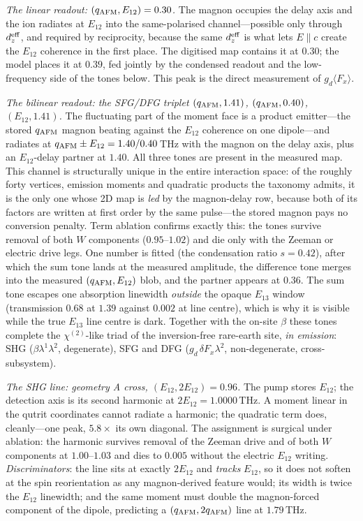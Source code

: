 \documentclass[aps,prb,twocolumn,superscriptaddress,longbibliography]{revtex4-2}
\newcommand{\qafm}{q_{\rm AFM}}
\begin{document}
\emph{The linear readout: $(\qafm,E_{12})=0.30$.}  The magnon
occupies the delay axis and the ion radiates at $E_{12}$ into the
same-polarised channel---possible only through $d_z^{\rm eff}$, and
required by reciprocity, because the same $d_z^{\rm eff}$ is what
lets $E\!\parallel\!c$ create the $E_{12}$ coherence in the first
place.  The digitised map contains it at $0.30$; the model places it
at $0.39$, fed jointly by the condensed readout and the low-frequency
side of the tones below.  This peak is the direct measurement of
$g_d\langle F_x\rangle$.

\emph{The bilinear readout: the SFG/DFG triplet $(\qafm,1.41)$,
$(\qafm,0.40)$, $(E_{12},1.41)$.}  The fluctuating part of the moment
face is a product emitter---the stored $\qafm$ magnon beating against
the $E_{12}$ coherence on one dipole---and radiates at
$\qafm\pm E_{12}=1.40/0.40$\,THz with the magnon on the delay axis,
plus an $E_{12}$-delay partner at $1.40$.  All three tones are
present in the measured map.  This channel is structurally unique in
the entire interaction space: of the roughly forty vertices, emission
moments and quadratic products the taxonomy admits, it is the only
one whose 2D map is \emph{led} by the magnon-delay row, because both
of its factors are written at first order by the same pulse---the
stored magnon pays no conversion penalty.  Term ablation confirms
exactly this: the tones survive removal of both $W$ components
($0.95$--$1.02$) and die only with the Zeeman or electric drive legs.
One number is fitted (the condensation ratio $s=0.42$), after which
the sum tone lands at the measured amplitude, the difference tone
merges into the measured $(\qafm,E_{12})$ blob, and the partner
appears at $0.36$.  The sum tone escapes one absorption linewidth
\emph{outside} the opaque $E_{13}$ window (transmission $0.68$ at
$1.39$ against $0.002$ at line centre), which is why it is visible
while the true $E_{13}$ line centre is dark.  Together with the
on-site $\beta$ these tones complete the $\chi^{(2)}$-like triad of
the inversion-free rare-earth site, \emph{in emission}: SHG
($\beta\lambda^1\lambda^2$, degenerate), SFG and DFG
($g_d\,\delta F_x\lambda^2$, non-degenerate, cross-subsystem).

\emph{The SHG line: geometry A cross, $(E_{12},2E_{12})=0.96$.}  The
pump stores $E_{12}$; the detection axis is its second harmonic at
$2E_{12}=1.0000$\,THz.  A moment linear in the qutrit coordinates
cannot radiate a harmonic; the quadratic term does, cleanly---one
peak, $5.8\times$ its own diagonal.  The assignment is surgical under
ablation: the harmonic survives removal of the Zeeman drive and of
both $W$ components at $1.00$--$1.03$ and dies to $0.005$ without the
electric $E_{12}$ writing.  \emph{Discriminators}: the line sits at
exactly $2E_{12}$ and \emph{tracks} $E_{12}$, so it does not soften
at the spin reorientation as any magnon-derived feature would; its
width is twice the $E_{12}$ linewidth; and the same moment must
double the magnon-forced component of the dipole, predicting a
$(\qafm,2\qafm)$ line at $1.79$\,THz.
\end{document}

